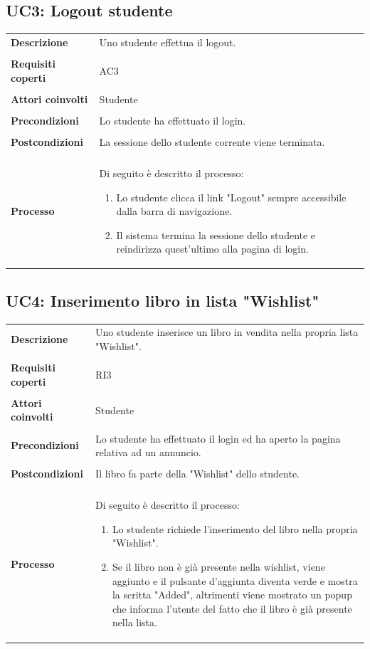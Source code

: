 \documentclass[10pt,a4paper]{report}
\begin{document}
	\subsection{UC3: Logout studente}
	\begin{tabular}{lp{}}
		\textbf{Descrizione}&Uno studente effettua il logout.\\
		\\
		\textbf{Requisiti coperti}&AC3\\
		\\
		\textbf{Attori coinvolti}&Studente\\
		\\
		\textbf{Precondizioni}&Lo studente ha effettuato il login.\\
		\\
		\textbf{Postcondizioni}&La sessione dello studente corrente viene terminata.\\
		\\
		\textbf{Processo}&Di seguito è descritto il processo:
		\begin{enumerate}
			\item Lo studente clicca il link "Logout" sempre accessibile dalla barra di navigazione.
			\item Il sistema termina la sessione dello studente e reindirizza quest'ultimo alla pagina di login.
		\end{enumerate}
	\end{tabular}

	\subsection{UC4: Inserimento libro in lista "Wishlist"}
	\begin{tabular}{lp{}}
		\textbf{Descrizione}&Uno studente inserisce un libro in vendita nella propria lista "Wishlist".\\
		\\
		\textbf{Requisiti coperti}&RI3\\
		\\
		\textbf{Attori coinvolti}&Studente\\
		\\
		\textbf{Precondizioni}&Lo studente ha effettuato il login ed ha aperto la pagina relativa ad un annuncio.\\
		\\
		\textbf{Postcondizioni}&Il libro fa parte della "Wishlist" dello studente.\\
		\\
		\textbf{Processo}&Di seguito è descritto il processo:
		\begin{enumerate}
			\item Lo studente richiede l'inserimento del libro nella propria "Wishlist".
			\item Se il libro non è già presente nella wishlist, viene aggiunto e il pulsante d'aggiunta diventa verde e mostra la scritta "Added", altrimenti viene mostrato un popup che informa l'utente del fatto che il libro è già presente nella lista.
		\end{enumerate}
	\end{tabular}
\end{document}
